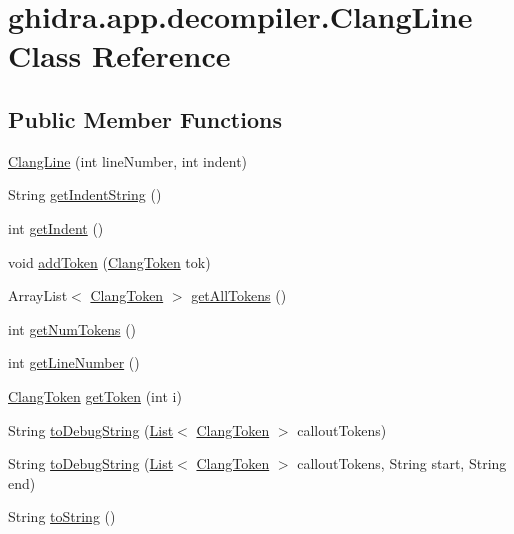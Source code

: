 \hypertarget{classghidra_1_1app_1_1decompiler_1_1_clang_line}{}\section{ghidra.\+app.\+decompiler.\+Clang\+Line Class Reference}
\label{classghidra_1_1app_1_1decompiler_1_1_clang_line}
\subsection*{Public Member Functions}
\begin{DoxyCompactItemize}
\item 
\mbox{\hyperlink{classghidra_1_1app_1_1decompiler_1_1_clang_line_ac72a0805f4ffb6f6545886aa9a326fa8}{Clang\+Line}} (int line\+Number, int indent)
\item 
String \mbox{\hyperlink{classghidra_1_1app_1_1decompiler_1_1_clang_line_a8fcbc3e32b7ed14d4d82d23440309581}{get\+Indent\+String}} ()
\item 
int \mbox{\hyperlink{classghidra_1_1app_1_1decompiler_1_1_clang_line_a82c474d776ae834e82ee74c8a2b4179f}{get\+Indent}} ()
\item 
void \mbox{\hyperlink{classghidra_1_1app_1_1decompiler_1_1_clang_line_a98375c4be1990b582f3ec1bd9bd6e5d5}{add\+Token}} (\mbox{\hyperlink{classghidra_1_1app_1_1decompiler_1_1_clang_token}{Clang\+Token}} tok)
\item 
Array\+List$<$ \mbox{\hyperlink{classghidra_1_1app_1_1decompiler_1_1_clang_token}{Clang\+Token}} $>$ \mbox{\hyperlink{classghidra_1_1app_1_1decompiler_1_1_clang_line_acd7202834ac518fee358031b56e82d79}{get\+All\+Tokens}} ()
\item 
int \mbox{\hyperlink{classghidra_1_1app_1_1decompiler_1_1_clang_line_a3b9517c266b79f7ef7f30fa62ba28ebe}{get\+Num\+Tokens}} ()
\item 
int \mbox{\hyperlink{classghidra_1_1app_1_1decompiler_1_1_clang_line_a2e767737c1ccf21aed5c5c2dbdf7ddce}{get\+Line\+Number}} ()
\item 
\mbox{\hyperlink{classghidra_1_1app_1_1decompiler_1_1_clang_token}{Clang\+Token}} \mbox{\hyperlink{classghidra_1_1app_1_1decompiler_1_1_clang_line_a2e61d9a83d43c0e43f5567469c1006ba}{get\+Token}} (int i)
\item 
String \mbox{\hyperlink{classghidra_1_1app_1_1decompiler_1_1_clang_line_a5260eb1f0f2447f123342cade62978c2}{to\+Debug\+String}} (\mbox{\hyperlink{xml_8hh_ab5ab62f46b3735557c125f91b40ac155}{List}}$<$ \mbox{\hyperlink{classghidra_1_1app_1_1decompiler_1_1_clang_token}{Clang\+Token}} $>$ callout\+Tokens)
\item 
String \mbox{\hyperlink{classghidra_1_1app_1_1decompiler_1_1_clang_line_a435789509abf36e99f0295ebba666853}{to\+Debug\+String}} (\mbox{\hyperlink{xml_8hh_ab5ab62f46b3735557c125f91b40ac155}{List}}$<$ \mbox{\hyperlink{classghidra_1_1app_1_1decompiler_1_1_clang_token}{Clang\+Token}} $>$ callout\+Tokens, String start, String end)
\item 
String \mbox{\hyperlink{classghidra_1_1app_1_1decompiler_1_1_clang_line_a8b8fb4cac28a9572630869d11dcc0448}{to\+String}} ()
\end{DoxyCompactItemize}


